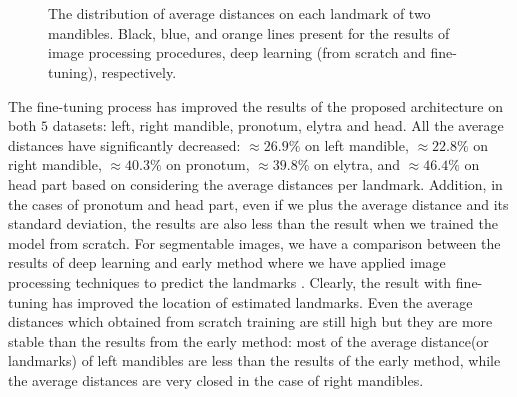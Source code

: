 \documentclass[review]{elsarticle}
\begin{document}
\begin{figure}[htbp]
    \centering
    \\
    ~~
    \caption{The distribution of average distances on each landmark of two mandibles. Black, blue, and orange lines present for the results of image processing procedures, deep learning (from scratch and fine-tuning), respectively. }
    \label{figdistmans}
\end{figure}

The fine-tuning process has improved the results of the proposed architecture on both $5$ datasets: left, right mandible, pronotum, elytra and head. All the average distances have significantly decreased: $\approx 26.9\%$ on left mandible, $\approx 22.8\%$ on right mandible, $\approx 40.3\%$ on pronotum, $\approx 39.8\%$ on elytra, and $\approx 46.4\%$  on head part based on considering the average distances per landmark. Addition, in the cases of pronotum and head part, even if we plus the average distance and its standard deviation, the results are also less than the result when we trained the model from scratch. For segmentable images, we have a comparison between the results of deep learning and early method where we have applied image processing techniques to predict the landmarks \cite{le2017maelab}. Clearly, the result with fine-tuning has improved the location of estimated landmarks. Even the average distances which obtained from scratch training are still high but they are more stable than the results from the early method: most of the average distance(or landmarks) of left mandibles are less than the results of the early method, while the average distances are very closed in the case of right mandibles.
\end{document}
